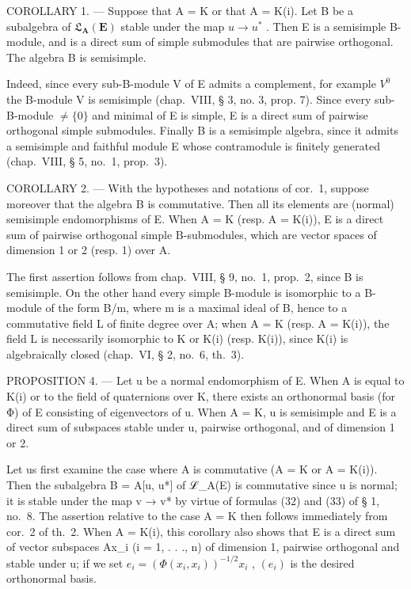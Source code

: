 COROLLARY 1. --- Suppose that A = K or that A = K(i). Let B be a subalgebra of \(\mathfrak{L}_{\mathbf{A}}(\mathbf{E})\) stable under the map \(u \to u^{*}\) . Then E is a semisimple B-module, and is a direct sum of simple submodules that are pairwise orthogonal. The algebra B is semisimple.

Indeed, since every sub-B-module V of E admits a complement, for example \(V^{0}\) the B-module V is semisimple (chap.~VIII, § 3, no. 3, prop. 7). Since every sub-B-module \(\neq\{0\}\) and minimal of E is simple, E is a direct sum of pairwise orthogonal simple submodules. Finally B is a semisimple algebra, since it admits a semisimple and faithful module E whose contramodule is finitely generated (chap.~VIII, § 5, no.~1, prop.~3).

COROLLARY 2. --- With the hypotheses and notations of cor.~1, suppose moreover that the algebra B is commutative. Then all its elements are (normal) semisimple endomorphisms of E. When A = K (resp. A = K(i)), E is a direct sum of pairwise orthogonal simple B-submodules, which are vector spaces of dimension 1 or 2 (resp. 1) over A.

The first assertion follows from chap.~VIII, § 9, no.~1, prop.~2, since B is semisimple. On the other hand every simple B-module is isomorphic to a B-module of the form B/m, where m is a maximal ideal of B, hence to a commutative field L of finite degree over A; when A = K (resp. A = K(i)), the field L is necessarily isomorphic to K or K(i) (resp. K(i)), since K(i) is algebraically closed (chap.~VI, § 2, no.~6, th.~3).

PROPOSITION 4. --- Let u be a normal endomorphism of E. When A is equal to K(i) or to the field of quaternions over K, there exists an orthonormal basis (for Φ) of E consisting of eigenvectors of u. When A = K, u is semisimple and E is a direct sum of subspaces stable under u, pairwise orthogonal, and of dimension 1 or 2.

Let us first examine the case where A is commutative (A = K or A = K(i)). Then the subalgebra B = A{[}u, u*{]} of ℒ\_A(E) is commutative since u is normal; it is stable under the map v → v* by virtue of formulas (32) and (33) of § 1, no.~8. The assertion relative to the case A = K then follows immediately from cor.~2 of th.~2. When A = K(i), this corollary also shows that E is a direct sum of vector subspaces Ax\_i (i = 1, . . ., n) of dimension 1, pairwise orthogonal and stable under u; if we set \(e_{i} = (\Phi(x_{i}, x_{i}))^{-1/2}x_{i}\) , \((e_{i})\) is the desired orthonormal basis.


